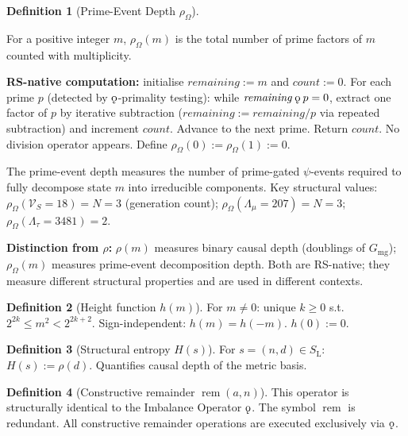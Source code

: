 \documentclass[11pt, letterpaper]{article}
\newcommand{\SL}{S_{\mathrm{L}}}
\newcommand{\rank}{\rho}
\newcommand{\hfn}{h}
\newcommand{\rem}{\operatorname{rem}}
\newcommand{\koppa}{\mathbin{\text{\rm\k{o}}}}
\theoremstyle{definition}
\newtheorem{definition}{Definition}[section]
\theoremstyle{plain}
\begin{document}
\begin{definition}[Prime-Event Depth $\rho_\Omega$]\label{def:primeventdepth}
\begin{rsbox}
For a positive integer $m$, $\rho_\Omega(m)$ is the total number of prime
factors of $m$ counted with multiplicity.

\textbf{RS-native computation:} initialise $\mathit{remaining}:=m$ and
$\mathit{count}:=0$.  For each prime $p$ (detected by $\koppa$-primality
testing): while $\mathit{remaining}\koppa p = 0$, extract one factor of $p$
by iterative subtraction ($\mathit{remaining}:=\mathit{remaining}/p$ via
repeated subtraction) and increment $\mathit{count}$.  Advance to the next
prime.  Return $\mathit{count}$.  No division operator appears.
Define $\rho_\Omega(0):=\rho_\Omega(1):=0$.

The prime-event depth measures the number of prime-gated $\psi$-events
required to fully decompose state $m$ into irreducible components.
Key structural values: $\rho_\Omega(\mathcal{V}_S\!=\!18)=N=3$
(generation count); $\rho_\Omega(\Lambda_\mu\!=\!207)=N=3$;
$\rho_\Omega(\Lambda_\tau\!=\!3481)=2$.

\textbf{Distinction from $\rank$:} $\rank(m)$ measures binary causal depth
(doublings of $G_{\mathrm{mg}}$); $\rho_\Omega(m)$ measures prime-event
decomposition depth.  Both are RS-native; they measure different structural
properties and are used in different contexts.
\end{rsbox}
\end{definition}

\begin{definition}[Height function $\hfn(m)$]\label{def:height}
For $m\neq 0$: unique $k\geq 0$ s.t.\ $2^{2k}\leq m^2<2^{2k+2}$.
Sign-independent: $\hfn(m)=\hfn(-m)$.  $\hfn(0):=0$.
\end{definition}

\begin{definition}[Structural entropy $H(s)$]\label{def:entropy}
For $s=(n,d)\in\SL$: $H(s):=\rank(d)$.  Quantifies causal depth of the
metric basis.
\end{definition}

\begin{definition}[Constructive remainder $\rem(a,n)$]\label{def:rem}
This operator is structurally identical to the Imbalance Operator $\koppa$. The symbol $\rem$ is redundant. All constructive remainder operations are executed exclusively via $\koppa$.
\end{definition}
\end{document}
